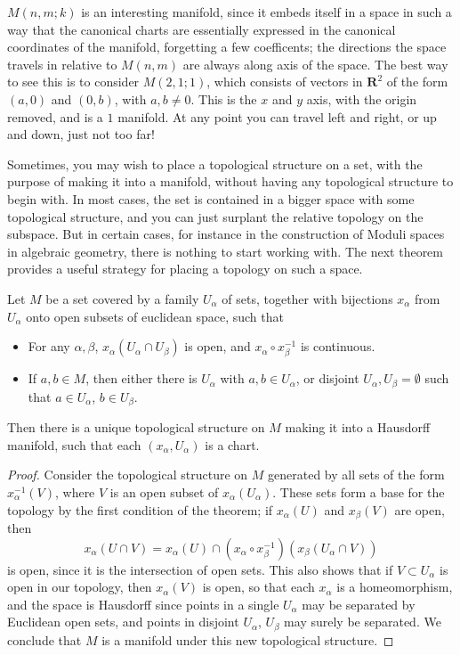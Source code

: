 $M(n,m;k)$ is an interesting manifold, since it embeds itself in a space in such a way that the canonical charts are essentially expressed in the canonical coordinates of the manifold, forgetting a few coefficents; the directions the space travels in relative to $M(n,m)$ are always along axis of the space. The best way to see this is to consider $M(2,1;1)$, which consists of vectors in $\mathbf{R}^2$ of the form $(a,0)$ and $(0,b)$, with $a,b \neq 0$. This is the $x$ and $y$ axis, with the origin removed, and is a $1$ manifold. At any point you can travel left and right, or up and down, just not too far!

Sometimes, you may wish to place a topological structure on a set, with the purpose of making it into a manifold, without having any topological structure to begin with. In most cases, the set is contained in a bigger space with some topological structure, and you can just surplant the relative topology on the subspace. But in certain cases, for instance in the construction of Moduli spaces in algebraic geometry, there is nothing to start working with. The next theorem provides a useful strategy for placing a topology on such a space.

\begin{theorem}
    Let $M$ be a set covered by a family $U_\alpha$ of sets, together with bijections $x_\alpha$ from $U_\alpha$ onto open subsets of euclidean space, such that
    \begin{itemize}
        \item For any $\alpha, \beta$, $x_\alpha(U_\alpha \cap U_\beta)$ is open, and $x_\alpha \circ x_\beta^{-1}$ is continuous.
        \item If $a, b \in M$, then either there is $U_\alpha$ with $a,b \in U_\alpha$, or disjoint $U_\alpha, U_\beta = \emptyset$ such that $a \in U_\alpha$, $b \in U_\beta$.
    \end{itemize}
    Then there is a unique topological structure on $M$ making it into a Hausdorff manifold, such that each $(x_\alpha, U_\alpha)$ is a chart.
\end{theorem}
\begin{proof}
    Consider the topological structure on $M$ generated by all sets of the form $x_\alpha^{-1}(V)$, where $V$ is an open subset of $x_\alpha(U_\alpha)$. These sets form a base for the topology by the first condition of the theorem; if $x_\alpha(U)$ and $x_\beta(V)$ are open, then
    \[ x_\alpha(U \cap V) = x_\alpha(U) \cap (x_\alpha \circ x_\beta^{-1})(x_\beta(U_\alpha \cap V)) \]
    is open, since it is the intersection of open sets. This also shows that if $V \subset U_\alpha$ is open in our topology, then $x_\alpha(V)$ is open, so that each $x_\alpha$ is a homeomorphism, and the space is Hausdorff since points in a single $U_\alpha$ may be separated by Euclidean open sets, and points in disjoint $U_\alpha$, $U_\beta$ may surely be separated. We conclude that $M$ is a manifold under this new topological structure.
\end{proof}

